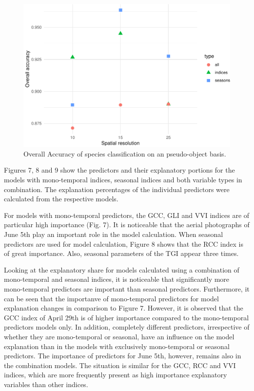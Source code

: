 \documentclass[]{article}
\begin{document}
\begin{figure}[H]

{\centering \includegraphics[width=0.6\linewidth]{report_files/figure-latex/validation_plots-1} 

}

\caption{Overall Accuracy of species classification on an pseudo-object basis.}\label{fig:validation_plots}
\end{figure}

Figures 7, 8 and 9 show the predictors and their explanatory portions
for the models with mono-temporal indices, seasonal indices and both
variable types in combination. The explanation percentages of the
individual predictors were calculated from the respective models.

For models with mono-temporal predictors, the GCC, GLI and VVI indices
are of particular high importance (Fig. 7). It is noticeable that the
aerial photographs of June 5th play an important role in the model
calculation. When seasonal predictors are used for model calculation,
Figure 8 shows that the RCC index is of great importance. Also, seasonal
parameters of the TGI appear three times.

Looking at the explanatory share for models calculated using a
combination of mono-temporal and seasonal indices, it is noticeable that
significantly more mono-temporal predictors are important than seasonal
predictors. Furthermore, it can be seen that the importanve of
mono-temporal predictors for model explanation changes in comparison to
Figure 7. However, it is observed that the GCC index of April 29th is of
higher importance compared to the mono-temporal predictors models only.
In addition, completely different predictors, irrespective of whether
they are mono-temporal or seasonal, have an influence on the model
explanation than in the models with exclusively mono-temporal or
seasonal predictors. The importance of predictors for June 5th, however,
remains also in the combination models. The situation is similar for the
GCC, RCC and VVI indices, which are more frequently present as high
importance explanatory variables than other indices.
\end{document}
